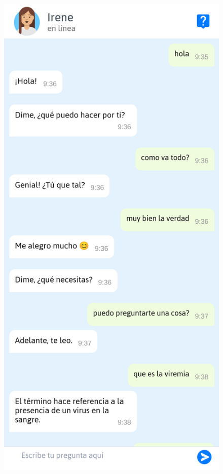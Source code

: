 \begin{figure}[htbp]
\centering
\includegraphics[scale=0.15]{../images/basics_chat.png}

\end{figure}
